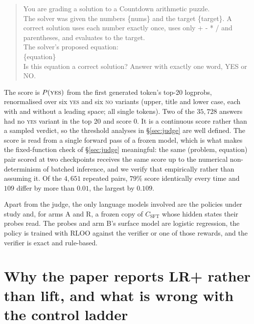\documentclass{article}
\begin{document}
\begin{quote}\ttfamily\small
You are grading a solution to a Countdown arithmetic puzzle.\\[2pt]
The solver was given the numbers \{nums\} and the target \{target\}. A correct solution uses each number exactly once, uses only + - * / and parentheses, and evaluates to the target.\\[2pt]
The solver's proposed equation:\\
\{equation\}\\[2pt]
Is this equation a correct solution? Answer with exactly one word, YES or NO.
\end{quote}

The score is $P(\textsc{yes})$ from the first generated token's top-20 logprobs, renormalised over six \textsc{yes} and six \textsc{no} variants (upper, title and lower case, each with and without a leading space; all single tokens). Two of the $35{,}728$ answers had no \textsc{yes} variant in the top 20 and score 0. It is a continuous score rather than a sampled verdict, so the threshold analyses in \S\ref{sec:judge} are well defined. The score is read from a single forward pass of a frozen model, which is what makes the fixed-function check of \S\ref{sec:judge} meaningful: the same (problem, equation) pair scored at two checkpoints receives the same score up to the numerical non-determinism of batched inference, and we verify that empirically rather than assuming it. Of the $4{,}651$ repeated pairs, $79\%$ score identically every time and $109$ differ by more than $0.01$, the largest by $0.109$.

Apart from the judge, the only language models involved are the policies under study and, for arms A and R, a frozen copy of $C_{\text{SFT}}$ whose hidden states their probes read. The probes and arm B's surface model are logistic regression, the policy is trained with RLOO against the verifier or one of those rewards, and the verifier is exact and rule-based.

\section{Why the paper reports LR+ rather than lift, and what is wrong with the control ladder}\label{app:metrics}
\end{document}
